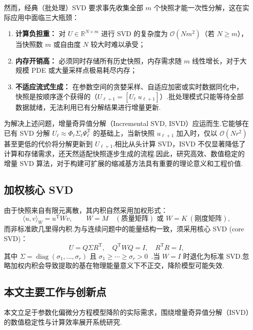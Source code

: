 然而，经典（批处理）SVD 要求事先收集全部 \(m\) 个快照才能一次性分解，这在实际应用中面临三大瓶颈：
\begin{enumerate}
    \item \textbf{计算负担重：} 对 \(U\in\mathbb{R}^{N\times m}\) 进行 SVD 的复杂度为 \(\mathcal{O}(N m^2)\)（若 \(N\ge m\)），当快照数 \(m\) 或自由度 \(N\) 较大时难以承受；
    \item \textbf{内存开销高：} 必须同时存储所有历史快照，内存需求随 \(m\) 线性增长，对于大规模 PDE 或大量采样点极易耗尽内存；
    \item \textbf{不适应流式生成：} 在参数空间的贪婪采样、自适应加密或实时数据同化中，快照是按顺序逐个获得的（\(U_{\ell+1}=[U_\ell\;u_{\ell+1}]\)）.批处理模式只能等待全部数据就绪，无法利用已有分解结果进行增量更新.
\end{enumerate}

为解决上述问题，增量奇异值分解（Incremental SVD, ISVD）应运而生.它能够在已有 SVD 分解 \(U_\ell \approx \Phi_\ell \Sigma_\ell \Psi_\ell^{\mathrm T}\) 的基础上，当新快照 \(u_{\ell+1}\) 加入时，仅以 \(\mathcal{O}(N r^2)\) 甚至更低的代价将分解更新到 \(U_{\ell+1}\).相比从头计算 SVD，ISVD 不仅显著降低了计算和存储需求，还天然适配快照逐步生成的流程.因此，研究高效、数值稳定的增量 SVD 算法，对于构建可扩展的缩减基方法具有重要的理论意义和工程价值.

\subsection{加权核心 SVD }
由于快照来自有限元离散，其内积自然采用加权形式：
\begin{equation}
\langle u,v\rangle_W = u^{\mathrm T} W v,\qquad W=M\quad (\text{质量矩阵}) \text{ 或 } W=K\ (\text{刚度矩阵}),
\end{equation}
而非标准欧几里得内积.为与连续问题中的能量结构一致，须采用核心 SVD (core SVD)：
\begin{equation}
U = Q \Sigma R^{\mathrm T},\quad Q^{\mathrm T}WQ=I,\quad R^{\mathrm T}R=I,
\end{equation}
其中 $\Sigma=\operatorname{diag}(\sigma_1,\dots,\sigma_r)$ 且 $\sigma_1\ge\cdots\ge\sigma_r>0$~\cite{fareed2018}.当 $W=I$ 时退化为标准 SVD.忽略加权内积会导致提取的基在物理能量意义下不正交，降阶模型可能失效.

\subsection{本文主要工作与创新点}

本文立足于参数化偏微分方程模型降阶的实际需求，围绕增量奇异值分解（ISVD）的数值稳定性与计算效率展开系统研究.

